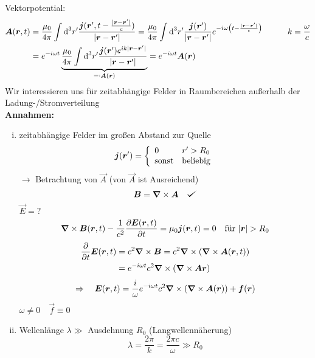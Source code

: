 \noindent
Vektorpotential:
\begin{align*}
\vec{A}(\vec{r},t) &= \frac{\mu_0}{4 \pi} \int \dd^3 r' \frac{\vec{j}(\vec{r}', t - \frac{|\vec{r} - \vec{r}'|}{c})}{|\vec{r} - \vec{r}'|} = \frac{\mu_0}{4 \pi} \int \dd^3 r' \frac{\vec{j}(\vec{r}')}{|\vec{r} - \vec{r}'|} e^{-i\omega \left(t - \frac{|\vec{r} - \vec{r}'|}{c}\right)} \qquad \quad k = \frac{\omega}{c} \\
&= e^{-i\omega t} \ub{\frac{\mu_0}{4 \pi} \int \dd^3 r' \frac{\vec{j}(\vec{r}') e^{i k |\vec{r} - \vec{r}'|}}{|\vec{r} - \vec{r}'|}}_{\eqdef \vec{A}(\vec{r})} = e^{ - i \omega t} \vec{A}(\vec{r})
\end{align*}
Wir interessieren uns für zeitabhängige Felder in Raumbereichen außerhalb der Ladung-/Stromverteilung\\[5pt]
\textbf{Annahmen:}
\begin{enumerate}[i)]
	\item zeitabhängige Felder im großen Abstand zur Quelle
	\begin{equation*}
	\bm{j} (\bm{r}') = \left\{ \begin{array}{ll} {0} & {r' > R_0} \\ {\textrm{sonst}} & {\textrm{beliebig}} \end{array} \right.
	\end{equation*}
	$ \rightarrow $ Betrachtung von $ \vec{A} $ (von $ \vec{A} $ ist Ausreichend)
	\begin{equation*}
	\vec{B} = \vabla \times \vec{A} \quad \checkmark
	\end{equation*}
	$ \vec{E} = ? $
	\begin{align*}
	\bm{\nabla} \times \bm{B}(\bm{r},t) - \frac{1}{c^2} \frac{\partial \bm{E}(\bm{r},t)}{\partial t} = \mu_0 \bm{j}(\bm{r},t) = 0 \quad \textrm{für } |\bm{r}| > R_0
	\end{align*}
	\begin{align*}
	\frac{\partial }{\partial t} \bm{E}(\bm{r},t) &= c^2 \bm{\nabla} \times \bm{B} = c^2 \bm{\nabla} \times (\bm{\nabla} \times \bm{A}(\bm{r},t))\\
	&= e^{-i\omega t} c^2 \bm{\nabla} \times (\bm{\nabla} \times \bm{A}\bm{r})
	\end{align*}
	\begin{equation*}
	\Rightarrow \quad \bm{E}(\bm{r},t) = \frac{i}{\omega} e^{-i\omega t} c^2 \bm{\nabla} \times (\bm{\nabla} \times \bm{A}(\bm{r})) + \bm{f}(\bm{r})
	\end{equation*}
	$ \omega \neq 0 \quad \vec{f} \equiv 0 $
	\item Wellenlänge $ \lambda \gg $ Ausdehnung $ R_0 $ (Langwellennäherung)
	\begin{equation*}
	\lambda = \frac{2 \pi}{k} = \frac{2 \pi c}{\omega} \gg R_0
	\end{equation*}
\end{enumerate}
